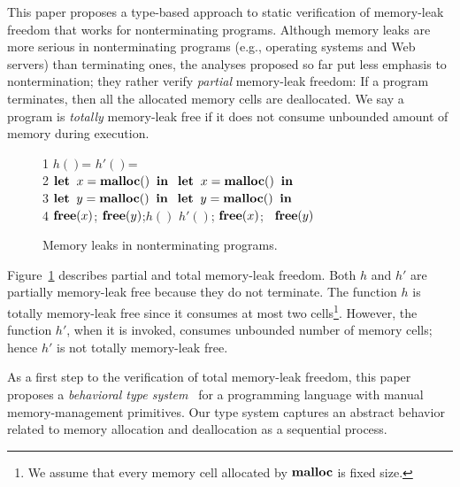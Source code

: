 This paper proposes a type-based approach to static verification of
memory-leak freedom that works for nonterminating programs.  Although
memory leaks are more serious in nonterminating programs (e.g.,
operating systems and Web servers) than terminating ones, the analyses
proposed so far put less emphasis to nontermination; they rather
verify \emph{partial} memory-leak freedom: If a program terminates,
then all the allocated memory cells are deallocated.  We say a program
is \emph{totally} memory-leak free if it does not consume unbounded
amount of memory during execution.


\begin{exmp}\label{ex:ex1}
\begin{figure}[h]
1  \Rtab $h()$= \dtb \dtb\dtb\Rtab$h'()$= \\
2  \dtb $\mathbf{let}\; \; x = \mathbf{malloc()}\;  \; \mathbf{in}\;$ \dtb \Rtab$\mathbf{let}\; \; x = \mathbf{malloc()}\;  \; \mathbf{in}\;$\\
3  \dtb $\mathbf{let}\; \; y = \mathbf{malloc()}\;  \; \mathbf{in}\;$ \dtb \Rtab$\mathbf{let}\; \; y = \mathbf{malloc()}\;  \; \mathbf{in}\;$\\
4  \dtb $\mathbf{free}(x)$; $\mathbf{free}(y) $;\;$h()$ \dtb \Rtab$h'()$; $\mathbf{free}(x)$; \ $\mathbf{free}(y)$
\caption{Memory leaks in nonterminating programs.}
\label{ex:np}
\end{figure}
Figure~\ref{ex:np} describes partial and total memory-leak freedom.
Both \(h\) and \(h'\) are partially memory-leak free because they do
not terminate.  The function \(h\) is totally memory-leak free since
it consumes at most two cells\footnote{We assume that every memory
  cell allocated by \(\mathbf{malloc}\) is fixed size.}.  However, the
function \(h'\), when it is invoked, consumes unbounded number of
memory cells; hence \(h'\) is not totally memory-leak free.
\end{exmp}

As a first step to the verification of total memory-leak freedom, this
paper proposes a \emph{behavioral type
  system}~\cite{DBLP:journals/lmcs/KobayashiSW06,DBLP:journals/tcs/IgarashiK04,DBLP:conf/esop/HondaVK98}
for a programming language with manual memory-management primitives.
Our type system captures an abstract behavior related to memory allocation and
deallocation as a sequential process.

